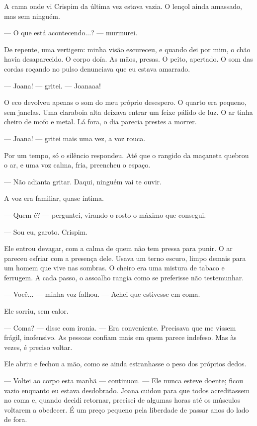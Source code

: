 A cama onde vi Crispim da última vez estava vazia. O lençol ainda amassado, mas sem ninguém.

— O que está acontecendo...? — murmurei.

De repente, uma vertigem: minha visão escureceu, e quando dei por mim, o chão havia desaparecido. O corpo doía.  
As mãos, presas. O peito, apertado. O som das cordas roçando no pulso denunciava que eu estava amarrado.

— Joana! — gritei. — Joanaaa!

O eco devolveu apenas o som do meu próprio desespero.  
O quarto era pequeno, sem janelas. Uma claraboia alta deixava entrar um feixe pálido de luz. O ar tinha cheiro de mofo e metal.  
Lá fora, o dia parecia prestes a morrer.

— Joana! — gritei mais uma vez, a voz rouca.

Por um tempo, só o silêncio respondeu. Até que o rangido da maçaneta quebrou o ar, e uma voz calma, fria, preencheu o espaço.

— Não adianta gritar. Daqui, ninguém vai te ouvir.

A voz era familiar, quase íntima.

— Quem é? — perguntei, virando o rosto o máximo que consegui.

— Sou eu, garoto. Crispim.

Ele entrou devagar, com a calma de quem não tem pressa para punir.  
O ar pareceu esfriar com a presença dele. Usava um terno escuro, limpo demais para um homem que vive nas sombras. O cheiro era uma mistura de tabaco e ferrugem. A cada passo, o assoalho rangia como se preferisse não testemunhar.

— Você... — minha voz falhou. — Achei que estivesse em coma.

Ele sorriu, sem calor.

— Coma? — disse com ironia. — Era conveniente. Precisava que me vissem frágil, inofensivo. As pessoas confiam mais em quem parece indefeso. Mas às vezes, é preciso voltar.

Ele abriu e fechou a mão, como se ainda estranhasse o peso dos próprios dedos.

— Voltei ao corpo esta manhã — continuou. — Ele nunca esteve doente; ficou vazio enquanto eu estava desdobrado. Joana cuidou para que todos acreditassem no coma e, quando decidi retornar, precisei de algumas horas até os músculos voltarem a obedecer. É um preço pequeno pela liberdade de passar anos do lado de fora.


